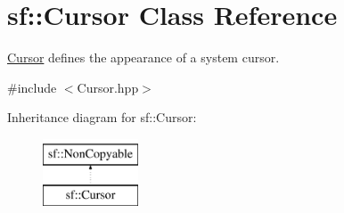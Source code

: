 \hypertarget{classsf_1_1_cursor}{}\section{sf\+:\+:Cursor Class Reference}
\label{classsf_1_1_cursor}


\mbox{\hyperlink{classsf_1_1_cursor}{Cursor}} defines the appearance of a system cursor.  




{\ttfamily \#include $<$Cursor.\+hpp$>$}

Inheritance diagram for sf\+:\+:Cursor\+:\begin{figure}[H]
\begin{center}
\leavevmode
\includegraphics[height=2.000000cm]{classsf_1_1_cursor}
\end{center}
\end{figure}

